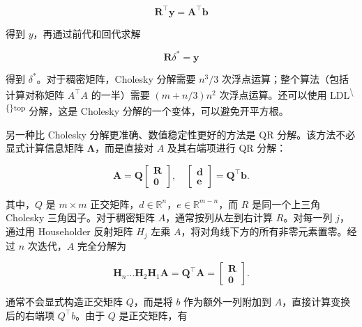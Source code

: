 \begin{equation}
\boldsymbol {R} ^ {\top} \boldsymbol {y} = \boldsymbol {A} ^ {\top} \boldsymbol {b}\tag{1.27}
\end{equation}

得到 $y$，再通过前代和回代求解

\begin{equation}
\boldsymbol {R} \delta^ {*} = \boldsymbol {y}\tag{1.28}
\end{equation}

得到 $\delta^*$。对于稠密矩阵，Cholesky 分解需要 $n^3/3$ 次浮点运算；整个算法（包括计算对称矩阵 $A^\top A$ 的一半）需要 $(m+n/3)n^2$ 次浮点运算。还可以使用 LDL\textsuperscript{\textbackslash\{\}top} 分解，这是 Cholesky 分解的一个变体，可以避免开平方根。

另一种比 Cholesky 分解更准确、数值稳定性更好的方法是 QR 分解。该方法不必显式计算信息矩阵 $\pmb\Lambda$，而是直接对 $A$ 及其右端项进行 QR 分解：

\begin{equation}
\boldsymbol {A} = \boldsymbol {Q} \left[ \begin{array}{c} \boldsymbol {R} \\ \boldsymbol {0} \end{array} \right], \quad \left[ \begin{array}{c} \boldsymbol {d} \\ \boldsymbol {e} \end{array} \right] = \boldsymbol {Q} ^ {\top} \boldsymbol {b}.\tag{1.29}
\end{equation}

其中，$Q$ 是 $m\times m$ 正交矩阵，$d\in\mathbb{R}^n$，$e\in\mathbb{R}^{m-n}$，而 $R$ 是同一个上三角 Cholesky 三角因子。对于稠密矩阵 $A$，通常按列从左到右计算 $R$。对每一列 $j$，通过用 Householder 反射矩阵 $H_j$ 左乘 $A$，将对角线下方的所有非零元素置零。经过 $n$ 次迭代，$A$ 完全分解为

\begin{equation}
\boldsymbol {H} _ {n} \dots \boldsymbol {H} _ {2} \boldsymbol {H} _ {1} \boldsymbol {A} = \boldsymbol {Q} ^ {\top} \boldsymbol {A} = \left[ \begin{array}{c} \boldsymbol {R} \\ \boldsymbol {0} \end{array} \right].\tag{1.30}
\end{equation}

通常不会显式构造正交矩阵 $Q$，而是将 $b$ 作为额外一列附加到 $A$，直接计算变换后的右端项 $Q^\top b$。由于 $Q$ 是正交矩阵，有


